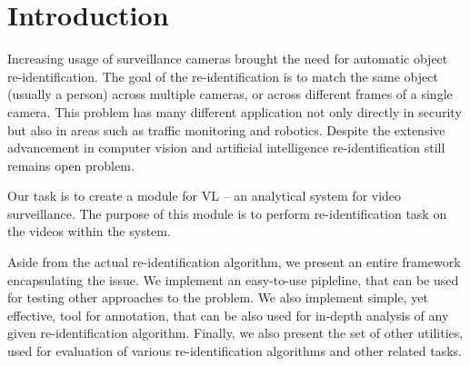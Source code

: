 \chapter*{Introduction}

Increasing usage of surveillance cameras brought the need for automatic object
re-identification.  The goal of the re-identification is to match the same
object (usually a person) across multiple cameras, or across different frames
of a single camera. This problem has many different application not only
directly in security but also in areas such as traffic monitoring and robotics.
Despite the extensive advancement in computer vision and artificial
intelligence re-identification still remains open problem.

Our task is to create a module for \gls{VL} -- an analytical system
for video surveillance. The purpose of this module is to perform
re-identification task on the videos within the system.

Aside from the actual re-identification algorithm, we present an entire
framework encapsulating the issue. We implement an easy-to-use pipleline, that
can be used for testing other approaches to the problem. We also implement
simple, yet effective, tool for annotation, that can be also used for
in-depth analysis of any given re-identification algorithm. Finally, we also
present the set of other utilities, used for evaluation of various
re-identification algorithms and other related tasks.

